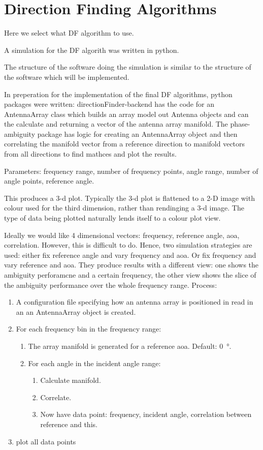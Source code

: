 \section{Direction Finding Algorithms}

Here we select what DF algorithm to use.

A simulation for the DF algorith was written in python.

The structure of the software doing the simulation is similar to the structure of the software which will be implemented.

In preperation for the implementation of the final DF algorithms, python packages were written: 
directionFinder-backend has the code for an AntennaArray class which builds an array model out Antenna objects and can the calculate and returning a vector of the antenna array manifold. The phase-ambiguity package has logic for creating an AntennaArray object and then correlating the manifold vector from a reference direction to manifold vectors from all directions to find mathces and plot the results.

Parameters:
frequency range, number of frequency points, angle range, number of angle points, reference angle.

This produces a 3-d plot. Typically the 3-d plot is flattened to a 2-D image with colour used for the third dimension, rather than rendinging a 3-d image. The type of data being plotted naturally lends itself to a colour plot view.


Ideally we would like 4 dimensional vectors: frequency, reference angle, aoa, correlation. However, this is difficult to do. Hence, two simulation strategies are used: either fix reference angle and vary frequency and aoa. Or fix frequency and vary reference and aoa. They produce results with a different view: one shows the ambiguity perforamcne and a certain frequency, the other view shows the slice of the ambiguity performance over the whole frequency range. Process:

\begin{enumerate}
  \item A configuration file specifying how an antenna array is positioned in read in an an AntennaArray object is created.
  \item For each frequency bin in the frequency range:
  \begin{enumerate}
    \item The array manifold is generated for a reference \gls{aoa}. Default: \SI{0}{\degree}.
    \item For each angle in the incident angle range:
    \begin{enumerate}
      \item Calculate manifold.
      \item Correlate.
      \item Now have data point: frequency, incident angle, correlation between reference and this.
    \end{enumerate}
  \end{enumerate}
  \item plot all data points
\end{enumerate}

